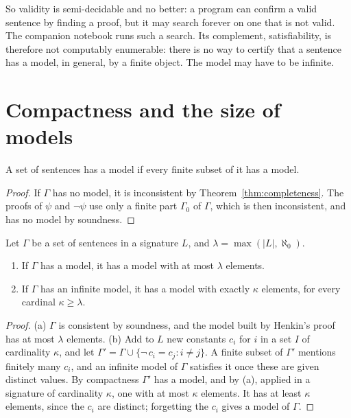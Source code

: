 So validity is semi-decidable and no better: a program can confirm a valid sentence by finding a proof, but it may search forever on one that is not valid. The companion notebook runs such a search. Its complement, satisfiability, is therefore not computably enumerable: there is no way to certify that a sentence has a model, in general, by a finite object. The model may have to be infinite.

\section{Compactness and the size of models}\label{sec:compactness}

\begin{corollary}\label{cor:compactness}
A set of sentences has a model if every finite subset of it has a model.
\end{corollary}

\begin{proof}
If $\Gamma$ has no model, it is inconsistent by Theorem~\ref{thm:completeness}. The proofs of $\psi$ and $\neg\psi$ use only a finite part $\Gamma_0$ of $\Gamma$, which is then inconsistent, and has no model by soundness.
\end{proof}

\begin{theorem}\label{thm:ls}
Let $\Gamma$ be a set of sentences in a signature $L$, and $\lambda=\max(|L|,\aleph_0)$.
\begin{enumerate}
\item If $\Gamma$ has a model, it has a model with at most $\lambda$ elements.
\item If $\Gamma$ has an infinite model, it has a model with exactly $\kappa$ elements, for every cardinal $\kappa\ge\lambda$.
\end{enumerate}
\end{theorem}

\begin{proof}
(a) $\Gamma$ is consistent by soundness, and the model built by Henkin's proof has at most $\lambda$ elements. (b) Add to $L$ new constants $c_i$ for $i$ in a set $I$ of cardinality $\kappa$, and let $\Gamma'=\Gamma\cup\{\neg\,c_i=c_j:i\ne j\}$. A finite subset of $\Gamma'$ mentions finitely many $c_i$, and an infinite model of $\Gamma$ satisfies it once these are given distinct values. By compactness $\Gamma'$ has a model, and by (a), applied in a signature of cardinality $\kappa$, one with at most $\kappa$ elements. It has at least $\kappa$ elements, since the $c_i$ are distinct; forgetting the $c_i$ gives a model of $\Gamma$.
\end{proof}

